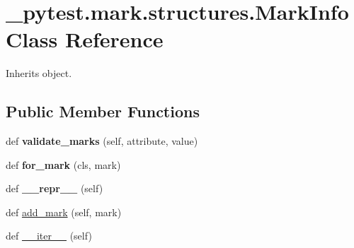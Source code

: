 \hypertarget{class__pytest_1_1mark_1_1structures_1_1_mark_info}{}\section{\+\_\+pytest.\+mark.\+structures.\+Mark\+Info Class Reference}
\label{class__pytest_1_1mark_1_1structures_1_1_mark_info}


Inherits object.

\subsection*{Public Member Functions}
\begin{DoxyCompactItemize}
\item 
\mbox{\label{class__pytest_1_1mark_1_1structures_1_1_mark_info_a3a5e1ea05728964407bc2557244e4be1}} 
def {\bfseries validate\+\_\+marks} (self, attribute, value)
\item 
\mbox{\label{class__pytest_1_1mark_1_1structures_1_1_mark_info_ac705cb51c8f244d33d7d17d91f50d64e}} 
def {\bfseries for\+\_\+mark} (cls, mark)
\item 
\mbox{\label{class__pytest_1_1mark_1_1structures_1_1_mark_info_ab67cb88a826135baac005ba342aba34e}} 
def {\bfseries \+\_\+\+\_\+repr\+\_\+\+\_\+} (self)
\item 
def \hyperlink{class__pytest_1_1mark_1_1structures_1_1_mark_info_ae018e39d2b0617a025f3c6f3042d0152}{add\+\_\+mark} (self, mark)
\item 
def \hyperlink{class__pytest_1_1mark_1_1structures_1_1_mark_info_a809398f06bd8bcd96db37f37f39c9d13}{\+\_\+\+\_\+iter\+\_\+\+\_\+} (self)
\end{DoxyCompactItemize}
